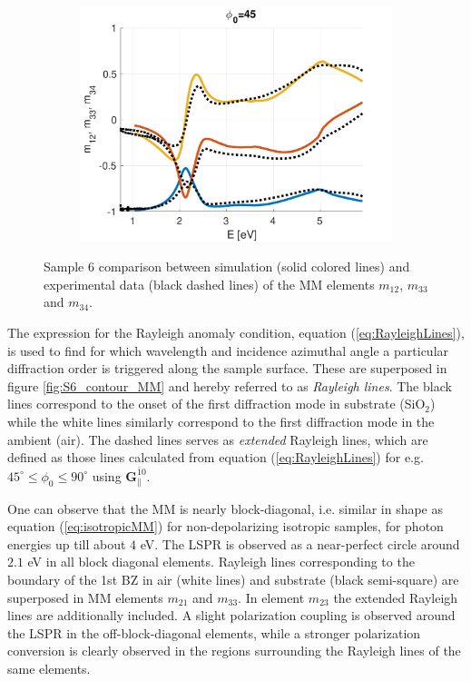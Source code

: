 \begin{figure}[h]
   \begin{subfigure}{\linewidth}
        \centering
        \includegraphics[width=0.49\linewidth, trim= 0cm 0cm 2cm 0cm, clip]{figures/ch4/S6/NCS/S6_NCS_phi45.pdf}
   \end{subfigure}
   \caption{Sample 6 comparison between simulation (solid colored lines) and experimental data (black dashed lines) of the MM elements $m_{12}$, $m_{33}$ and $m_{34}$.}
   \label{fig:S6_NCS}
\end{figure}

The expression for the Rayleigh anomaly condition, equation (\ref{eq:RayleighLines}), is used to find for which wavelength and incidence azimuthal angle a particular diffraction order is triggered along the sample surface. These are superposed in figure \ref{fig:S6_contour_MM} and hereby referred to as \emph{Rayleigh lines}. The black lines correspond to the onset of the first diffraction mode in substrate (SiO$_2$) while the white lines similarly correspond to the first diffraction mode in the ambient (air). The dashed lines serves as \emph{extended} Rayleigh lines, which are defined as those lines calculated from equation (\ref{eq:RayleighLines}) for e.g. $45^\circ \leq \phi_0 \leq 90^\circ$ using $\mathbf{G}_\parallel^{\bar{1}0}$.

One can observe that the MM is nearly block-diagonal, i.e. similar in shape as equation (\ref{eq:isotropicMM}) for non-depolarizing isotropic samples, for photon energies up till about $4$ eV. The LSPR is observed as a near-perfect circle around $2.1$ eV in all block diagonal elements. Rayleigh lines corresponding to the boundary of the 1st BZ in air (white lines) and substrate (black semi-square) are superposed in MM elements $m_{21}$ and $m_{33}$. In element $m_{23}$ the extended Rayleigh lines are additionally included. A slight polarization coupling is observed around the LSPR in the off-block-diagonal elements, while a stronger polarization conversion is clearly observed in the regions surrounding the Rayleigh lines of the same elements. 

